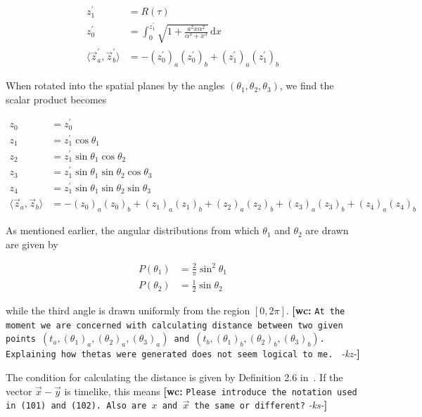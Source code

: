 \documentclass[preprint,notitlepage,amsmath,amssymb,floatfix]{revtex4-1}
\newcommand{\XXX}[3]{{\bf [#1: } {\tt #3} {\it -#2-}{\bf ]}}
\begin{document}
\begin{equation}
\begin{split}
z^\prime_1 &= R\left(\tau\right) \\
z^\prime_0 &= \int_0^{z^\prime_1} \! \sqrt{1 + \frac{a^2x\alpha^2}{\alpha^3 + x^3}} \, \mathrm{d}x \\
\langle \vec{z}^\prime_a, \vec{z}^\prime_b \rangle &= -\left(z^\prime_0\right)_a \left(z^\prime_0\right)_b + \left(z^\prime_1\right)_a \left(z^\prime_1\right)_b
\end{split}
\end{equation}

\noindent When rotated into the spatial planes by the angles $(\theta_1, \theta_2, \theta_3)$, we find the scalar product becomes 

\begin{equation}
\begin{split}
z_0 &= z^\prime_0 \\
z_1 &= z^\prime_1\cos\theta_1 \\
z_2 &= z^\prime_1\sin\theta_1\cos\theta_2 \\
z_3 &= z^\prime_1\sin\theta_1\sin\theta_2\cos\theta_3 \\
z_4 &= z^\prime_1\sin\theta_1\sin\theta_2\sin\theta_3 \\
\langle \vec{z}_a, \vec{z}_b \rangle &= -\left(z_0\right)_a\left(z_0\right)_b + \left(z_1\right)_a\left(z_1\right)_b + \left(z_2\right)_a\left(z_2\right)_b + \left(z_3\right)_a\left(z_3\right)_b + \left(z_4\right)_a\left(z_4\right)_b
\end{split}
\end{equation}

\noindent As mentioned earlier, the angular distributions from which $\theta_1$ and $\theta_2$ are drawn are given by 

\begin{equation}
\begin{split}
P\left(\theta_1\right) &= \frac{2}{\pi}\sin^2\theta_1 \\
P\left(\theta_2\right) &= \frac{1}{2}\sin\theta_2 
\end{split}
\end{equation}

\noindent while the third angle is drawn uniformly from the region $\left[0, 2\pi\right]$. \XXX{wc}{kz}{At the moment we are concerned with calculating distance between two given points $(t_a,(\theta_1)_a,(\theta_2)_a,(\theta_3)_a)$  and $(t_b,(\theta_1)_b,(\theta_2)_b,(\theta_3)_b)$. Explaining how thetas were generated does not seem logical to me. }\par
The condition for calculating the distance is given by Definition 2.6 in~\cite{ref:asmus2009}.
If the vector $\vec{x}-\vec{y}$ is timelike, this means \XXX{wc}{ks}{Please introduce the notation used in (101) and (102). Also are $x$ and $\vec x$ the same or different?}
\end{document}
